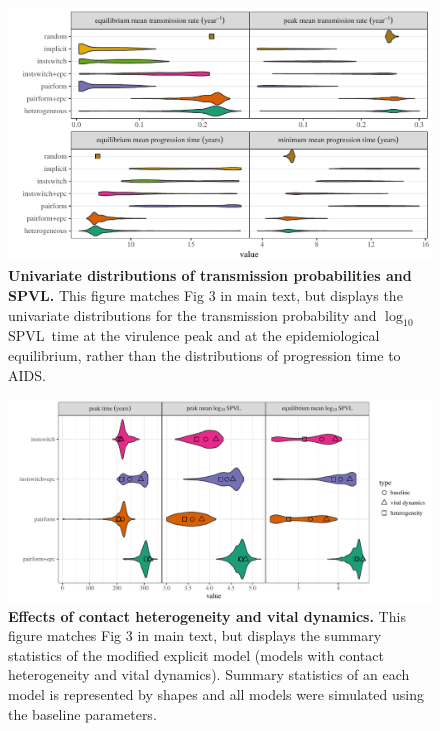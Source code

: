 \documentclass[10pt,letterpaper]{article}
\newcommand{\Lspvl}{$\log_{10}$ SPVL}
\begin{document}
\clearpage

\begin{figure}[!ht]
  \includegraphics[width=\textwidth]{../figures/fig_S2_3.pdf}
\caption{{\bf Univariate distributions of transmission probabilities and SPVL.}
This figure matches Fig 3 in main text, but displays the
univariate distributions for the transmission probability and \Lspvl\ time at the virulence
peak and at the epidemiological equilibrium,
rather than the distributions of progression time to AIDS.
}
\label{fig:tranvirsum}
\end{figure}

\clearpage

\begin{figure}[!ht]
  \includegraphics[width=\textwidth]{../figures/fig_S2_4.pdf}
\caption{{\bf Effects of contact heterogeneity and vital dynamics.}
This figure matches Fig 3 in main text, but displays the
summary statistics of the modified explicit model (models with contact heterogeneity and vital dynamics).
Summary statistics of an each model is represented by shapes and all models were simulated using the baseline parameters.
}
\label{fig:fig3aug}
\end{figure}
\end{document}
